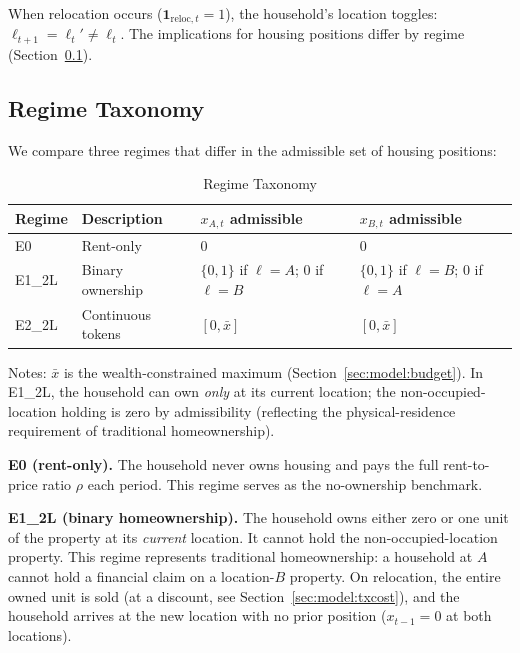 When relocation occurs ($\mathbf{1}_{\text{reloc},t} = 1$), the household's
location toggles: $\ell_{t+1} = \ell_t' \neq \ell_t$.  The implications
for housing positions differ by regime (Section~\ref{sec:model:regimes}).

\subsection{Regime Taxonomy}
\label{sec:model:regimes}

We compare three regimes that differ in the admissible set of housing
positions:

\begin{table}[ht]
    \centering
    \caption{Regime Taxonomy}
    \label{tab:regimes}
    \renewcommand{\arraystretch}{1.20}
    \begin{tabular}{llll}
        \toprule
        Regime & Description & $x_{A,t}$ admissible & $x_{B,t}$ admissible \\
        \midrule
        E0     & Rent-only         & $0$ & $0$ \\
        E1\_2L & Binary ownership  & $\{0,1\}$ if $\ell=A$; $0$ if $\ell=B$
                                   & $\{0,1\}$ if $\ell=B$; $0$ if $\ell=A$ \\
        E2\_2L & Continuous tokens & $[0, \bar{x}]$ & $[0, \bar{x}]$ \\
        \bottomrule
    \end{tabular}
    \smallskip
    \begin{minipage}{\linewidth}
        \footnotesize
        Notes: $\bar{x}$ is the wealth-constrained maximum (Section~\ref{sec:model:budget}).
        In E1\_2L, the household can own \emph{only} at its current location; the
        non-occupied-location holding is zero by admissibility (reflecting the
        physical-residence requirement of traditional homeownership).
    \end{minipage}
\end{table}

\noindent\textbf{E0 (rent-only).}  The household never owns housing and pays
the full rent-to-price ratio $\rho$ each period.  This regime serves as the
no-ownership benchmark.

\noindent\textbf{E1\_2L (binary homeownership).}  The household owns either
zero or one unit of the property at its \emph{current} location.  It cannot
hold the non-occupied-location property.  This regime represents traditional
homeownership: a household at $A$ cannot hold a financial claim on a
location-$B$ property.  On relocation, the entire owned unit is sold
(at a discount, see Section~\ref{sec:model:txcost}), and the household
arrives at the new location with no prior position ($x_{t-1} = 0$ at
both locations).

